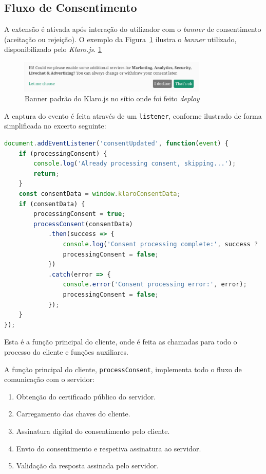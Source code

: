 \subsection{Fluxo de Consentimento}
A extensão é ativada após interação do utilizador com o \textit{banner} de consentimento (aceitação ou rejeição). O exemplo da Figura~\ref{fig:klarojs-banner} ilustra o \textit{banner} utilizado, disponibilizado pelo \textit{Klaro.js}. \ref{fig:klarojs-banner}

\begin{figure}[h]
    \centering
	\includegraphics[width=0.8\textwidth]{images/klaro_banner.png}
    \caption{Banner padrão do Klaro.js no sítio onde foi feito \textit{deploy}}
    \label{fig:klarojs-banner}
\end{figure}

A captura do evento é feita através de um \texttt{listener}, conforme ilustrado de forma simplificada no excerto seguinte:

\begin{lstlisting}[language=Javascript]
document.addEventListener('consentUpdated', function(event) {
	if (processingConsent) {
		console.log('Already processing consent, skipping...');
		return;
	}
	const consentData = window.klaroConsentData;
	if (consentData) {
		processingConsent = true;
		processConsent(consentData)
			.then(success => {
				console.log('Consent processing complete:', success ? 'Success' : 'Failed');
				processingConsent = false;
			})
			.catch(error => {
				console.error('Consent processing error:', error);
				processingConsent = false;
			});
	}
});
\end{lstlisting}

Esta é a função principal do cliente, onde é feita as chamadas para todo o processo do cliente e funções auxiliares.

A função principal do cliente, \texttt{processConsent}, implementa todo o fluxo de comunicação com o servidor:
\begin{enumerate}
    \item Obtenção do certificado público do servidor.
    \item Carregamento das chaves do cliente.
    \item Assinatura digital do consentimento pelo cliente.
    \item Envio do consentimento e respetiva assinatura ao servidor.
    \item Validação da resposta assinada pelo servidor.
\end{enumerate}

